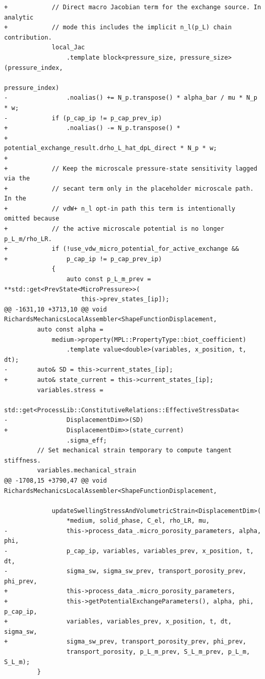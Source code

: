 \documentclass[10pt]{article}
\begin{document}
\begin{lstlisting}
+            // Direct macro Jacobian term for the exchange source. In analytic
+            // mode this includes the implicit n_l(p_L) chain contribution.
             local_Jac
                 .template block<pressure_size, pressure_size>(pressure_index,
                                                               pressure_index)
-                .noalias() += N_p.transpose() * alpha_bar / mu * N_p * w;
-            if (p_cap_ip != p_cap_prev_ip)
+                .noalias() -= N_p.transpose() *
+                              potential_exchange_result.drho_L_hat_dpL_direct * N_p * w;
+
+            // Keep the microscale pressure-state sensitivity lagged via the
+            // secant term only in the placeholder microscale path. In the
+            // vdW+ n_l opt-in path this term is intentionally omitted because
+            // the active microscale potential is no longer p_L_m/rho_LR.
+            if (!use_vdw_micro_potential_for_active_exchange &&
+                p_cap_ip != p_cap_prev_ip)
             {
                 auto const p_L_m_prev = **std::get<PrevState<MicroPressure>>(
                     this->prev_states_[ip]);
@@ -1631,10 +3713,10 @@ void RichardsMechanicsLocalAssembler<ShapeFunctionDisplacement,
         auto const alpha =
             medium->property(MPL::PropertyType::biot_coefficient)
                 .template value<double>(variables, x_position, t, dt);
-        auto& SD = this->current_states_[ip];
+        auto& state_current = this->current_states_[ip];
         variables.stress =
             std::get<ProcessLib::ConstitutiveRelations::EffectiveStressData<
-                DisplacementDim>>(SD)
+                DisplacementDim>>(state_current)
                 .sigma_eff;
         // Set mechanical strain temporary to compute tangent stiffness.
         variables.mechanical_strain
@@ -1708,15 +3790,47 @@ void RichardsMechanicsLocalAssembler<ShapeFunctionDisplacement,
 
             updateSwellingStressAndVolumetricStrain<DisplacementDim>(
                 *medium, solid_phase, C_el, rho_LR, mu,
-                this->process_data_.micro_porosity_parameters, alpha, phi,
-                p_cap_ip, variables, variables_prev, x_position, t, dt,
-                sigma_sw, sigma_sw_prev, transport_porosity_prev, phi_prev,
+                this->process_data_.micro_porosity_parameters,
+                this->getPotentialExchangeParameters(), alpha, phi, p_cap_ip,
+                variables, variables_prev, x_position, t, dt, sigma_sw,
+                sigma_sw_prev, transport_porosity_prev, phi_prev,
                 transport_porosity, p_L_m_prev, S_L_m_prev, p_L_m, S_L_m);
         }
 

\end{lstlisting}
\end{document}
